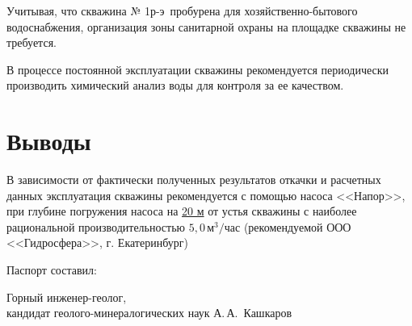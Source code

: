\documentclass[a4paper,12pt]{article} %
\newcommand{\txtExecutor}{ООО <<Гидросфера>>}			%
\newcommand{\txtNumber}{№ 1р-э}  					%
\newcommand{\txtPump}{<<Напор>>}  					%
\newcommand{\txtDebit}{5,0}							%
\begin{document}
Учитывая, что скважина \txtNumber \, пробурена для хозяйственно-бытового водоснабжения, организация зоны санитарной охраны на площадке скважины не требуется.

В процессе постоянной эксплуатации скважины рекомендуется периодически производить химический анализ воды для контроля за ее качеством.

\section*{Выводы}

В зависимости от фактически полученных результатов откачки и расчетных данных эксплуатация скважины рекомендуется с помощью насоса  \txtPump, при глубине погружения насоса  на \underline{20 м} от устья скважины с наиболее рациональной производительностью 	$\txtDebit \,м^3/час$ (рекомендуемой \txtExecutor, г. Екатеринбург)

\bigskip

Паспорт составил:

\bigskip

\begin{minipage}{1.0\textwidth}
	Горный инженер-геолог,\\
	кандидат геолого-минералогических наук 
	А.\,А.~Кашкаров
\end{minipage}
\end{document}

